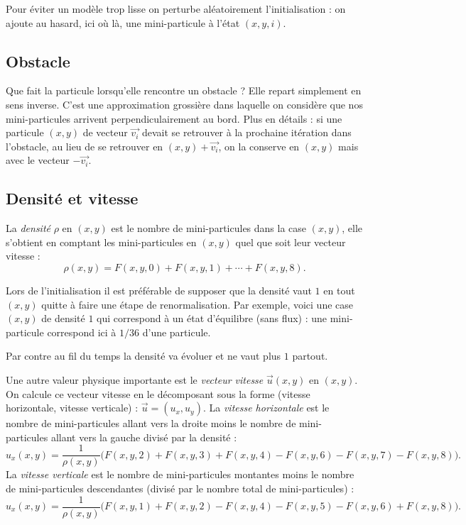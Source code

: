 \documentclass[11pt,class=report,crop=false]{standalone}
\begin{document}

Pour éviter un modèle trop \og{}lisse\fg{} on perturbe aléatoirement l'initialisation : on ajoute au hasard, ici où là, une mini-particule à l'état $(x,y,i)$.


\subsection{Obstacle}

Que fait la particule lorsqu'elle rencontre un obstacle ? Elle repart simplement en sens inverse. C'est une approximation grossière dans laquelle on considère que nos mini-particules arrivent perpendiculairement au bord.
Plus en détails : si une particule $(x,y)$ de vecteur $\vec{v_i}$ devait se retrouver à la prochaine itération dans l'obstacle, au lieu de se retrouver en $(x,y) + \vec{v_i}$, on la conserve en $(x,y)$ mais avec le vecteur $-\vec{v_i}$.



\subsection{Densité et vitesse}

La \emph{densité} $\rho$ en $(x,y)$ est le nombre de mini-particules dans la case $(x,y)$, elle s'obtient en comptant les mini-particules en $(x,y)$ quel que soit leur vecteur vitesse :
$$\rho(x,y) = F(x,y,0) + F(x,y,1) + \cdots + F(x,y,8).$$

Lors de l'initialisation il est préférable de supposer que la densité vaut $1$ en tout $(x,y)$ quitte à faire une étape de renormalisation.
Par exemple, voici une case $(x,y)$ de densité $1$ qui correspond à un état d'équilibre (sans flux) : une mini-particule correspond ici à $1/36$ d'une particule.


Par contre au fil du temps la densité va évoluer et ne vaut plus $1$ partout.

\medskip

Une autre valeur physique importante est le \emph{vecteur vitesse} $\vec{u}(x,y)$ en $(x,y)$. On calcule ce vecteur vitesse en le décomposant sous la forme (vitesse horizontale, vitesse verticale) :  $\vec{u} = (u_x, u_y)$.
La \emph{vitesse horizontale} est le nombre de mini-particules allant vers la droite moins le nombre de mini-particules allant vers la gauche divisé par la densité :
$$u_x(x,y) = \frac{1}{\rho(x,y)} \big(F(x,y,2) + F(x,y,3) + F(x,y,4) - F(x,y,6) - F(x,y,7) - F(x,y,8)\big).$$
La \emph{vitesse verticale} est le nombre de mini-particules montantes moins le nombre de mini-particules descendantes (divisé par le nombre total de mini-particules) :
$$u_x(x,y) = \frac{1}{\rho(x,y)} \big(F(x,y,1) + F(x,y,2) - F(x,y,4) - F(x,y,5) - F(x,y,6) + F(x,y,8)\big).$$ 
\end{document}
